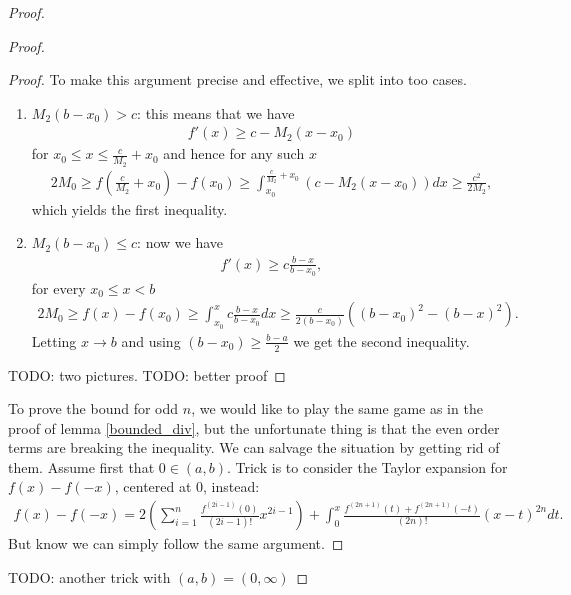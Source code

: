 \begin{proof}
\begin{proof}
\begin{proof}
			To make this argument precise and effective, we split into too cases.

			\begin{enumerate}
				\item $M_{2} (b - x_{0}) > c$: this means that we have
				\begin{align*}
					f'(x) \geq c - M_{2} (x - x_{0})
				\end{align*}
				for $x_{0} \leq x \leq \frac{c}{M_{2}} + x_{0}$ and hence for any such $x$
				\begin{align*}
					2 M_{0} \geq f\left(\frac{c}{M_{2}} + x_{0}\right) - f(x_{0}) \geq \int_{x_{0}}^{\frac{c}{M_{2}} + x_{0}} \left(c - M_{2} (x - x_{0})\right) dx \geq \frac{c^2}{2 M_{2}},
				\end{align*}
				which yields the first inequality.
				\item $M_{2} (b - x_{0}) \leq c$: now we have
				\begin{align*}
					f'(x) \geq c \frac{b - x}{b - x_{0}},
				\end{align*}
				for every $x_{0} \leq x < b$
				\begin{align*}
					2 M_{0} \geq f(x) - f(x_{0}) \geq \int_{x_{0}}^{x}  c \frac{b - x}{b - x_{0}} d x \geq \frac{c}{2(b - x_{0})} \left((b - x_{0})^2 - (b - x)^2\right).
				\end{align*}
				Letting $x \to b$ and using $(b - x_{0}) \geq \frac{b - a}{2}$ we get the second inequality.
			\end{enumerate}

			TODO: two pictures.
			TODO: better proof
		\end{proof}

		To prove the bound for odd $n$, we would like to play the same game as in the proof of lemma \ref{bounded_div}, but the unfortunate thing is that the even order terms are breaking the inequality. We can salvage the situation by getting rid of them. Assume first that $0 \in (a, b)$. Trick is to consider the Taylor expansion for $f(x) - f(-x)$, centered at $0$, instead:
		\begin{align*}
			f(x) - f(-x) = 2 \left(\sum_{i = 1}^{n} \frac{f^{(2 i - 1)}(0)}{(2 i - 1)!}x^{2 i - 1}\right) + \int_{0}^{x} \frac{f^{(2 n + 1)}(t) + f^{(2 n + 1)}(-t)}{(2n)!} (x - t)^{2 n} dt.
		\end{align*}
		But know we can simply follow the same argument.
	\end{proof}

	TODO: another trick with $(a, b) = (0, \infty)$
\end{proof}


